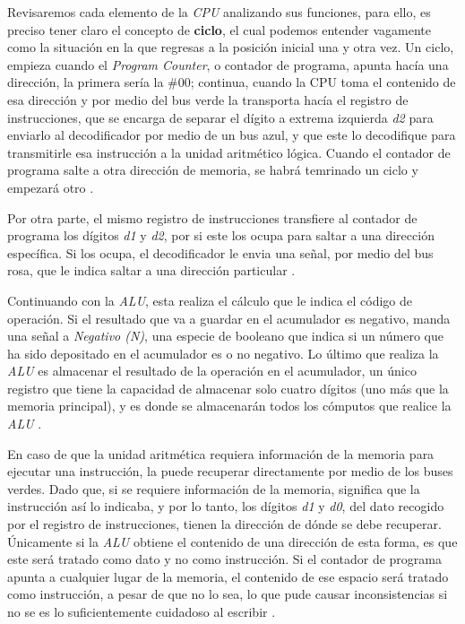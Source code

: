 \documentclass[letterpaper,12pt,oneside]{book}
\begin{document}
	Revisaremos cada elemento de la \textit{CPU} analizando sus funciones, para ello,
	es preciso tener claro el concepto de \textbf{ciclo}, el cual podemos entender vagamente 
	como la situación en la que regresas a la posición inicial una y otra vez. Un ciclo, empieza
	cuando el \textit{Program Counter}, o contador de programa, apunta hacía una dirección, 
	la primera sería la \#00; continua,
	cuando la CPU toma el contenido de esa dirección y por medio del bus verde la transporta hacía el 
	registro de instrucciones, que se encarga de separar el dígito a extrema izquierda \textit{d2}
	para enviarlo al decodificador
	por medio de un bus azul, y que este lo decodifique
	para transmitirle esa instrucción a la 
	unidad aritmético lógica. Cuando el contador de programa salte a otra dirección de memoria, 
	se habrá temrinado un ciclo y
	empezará otro \cite{fingerman_instruction_1968}. 
 
    Por otra parte, el mismo registro de instrucciones transfiere al contador de programa 
	los dígitos \textit{d1} y \textit{d2},
	por si este los ocupa para saltar a una dirección específica. Si los ocupa, el decodificador 
	le envia una señal, por medio 
	del bus rosa, que le indica saltar a una dirección particular \cite{fingerman_instruction_1968}.
	
	Continuando con la \textit{ALU}, esta realiza el cálculo que le indica el código de operación.
	Si el resultado que va a guardar
	en el acumulador es negativo, manda una señal a \textit{Negativo (N)},
	una especie de booleano que indica si un número 
	que ha sido depositado en el acumulador es
	o no negativo. Lo último que realiza la \textit{ALU} es almacenar el resultado de la operación
	en el  acumulador, un único registro
	que tiene la capacidad de almacenar solo cuatro dígitos (uno más que la memoria principal), 
	y es donde se almacenarán todos
	los cómputos que realice la \textit{ALU} \cite{fingerman_instruction_1968}. 
	
	En caso de que la unidad aritmética requiera información
	de la memoria  para ejecutar una instrucción,
	la puede recuperar directamente por medio de los buses verdes. Dado que, si se requiere información
	de la memoria, significa que la instrucción así lo indicaba,
	y por lo tanto, los dígitos \textit{d1} y \textit{d0}, del dato recogido por el registro
	de instrucciones,
	tienen la dirección de dónde se debe recuperar.  Únicamente
	si la \textit{ALU} obtiene el contenido de una dirección de esta forma, es que este
	será tratado como dato y no como instrucción. Si el contador de programa apunta a cualquier
	lugar de la memoria, el contenido de ese espacio será tratado como instrucción, a pesar
	de que no lo sea, lo que pude causar inconsistencias si no se es lo suficientemente
	 cuidadoso al escribir \cite{fingerman_instruction_1968}.
	
\end{document}
